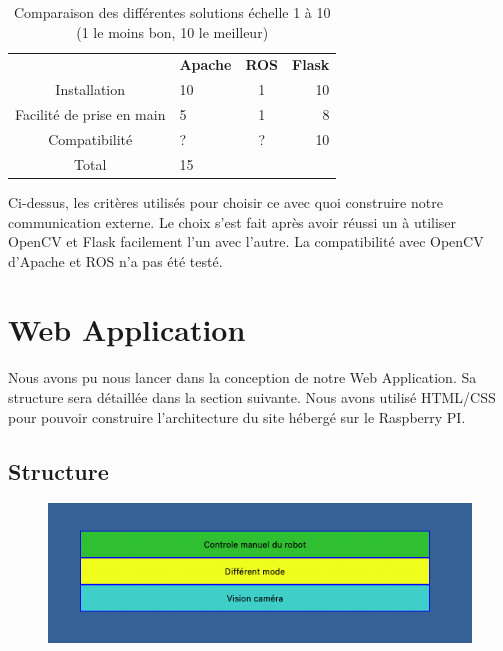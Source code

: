 \documentclass[
	a4paper,									%
	11pt,										%
	twoside,									%
	openright,									%
	notitlepage,									%
	parskip=half,								%
]{scrreprt}										%
\begin{document}
\begin{table}[h!]
    \begin{center}
        \caption{Comparaison des différentes solutions échelle 1 à 10 (1 le moins bon, 10 le meilleur)}
        \vspace{5mm}
        \label{tab:table1}
        \begin{tabular}{c|l|c|r} %
            \toprule
            \textbf{ } & \textbf{Apache} & \textbf{ROS} & \textbf{Flask}\\
            Installation & 10 & 1 & 10 \\
            Facilité de prise en main & 5 & 1 & 8\\
            Compatibilité & ? & ? & 10\\
			\midrule
			Total & 15 & \cellcolor{red}{2} & \cellcolor{green}{28}\\
            \bottomrule
        \end{tabular}
    \end{center}    
\end{table}

Ci-dessus, les critères utilisés pour choisir ce avec quoi construire notre communication externe. 
Le choix s'est fait après avoir réussi un à utiliser OpenCV et Flask facilement l'un avec l'autre. 
La compatibilité avec OpenCV d'Apache et ROS n'a pas été testé. \par


\chapter{Web Application}

Nous avons pu nous lancer dans la conception de notre Web Application. Sa structure sera détaillée dans la section suivante. 
Nous avons utilisé HTML/CSS pour pouvoir construire l'architecture du site hébergé sur le Raspberry PI. \par

\section{Structure}

\begin{figure}[!ht]
	\centering
	\includegraphics[scale=.5]{img/Page_Accueil_texte.png}
	\vspace{.5cm}
	\label{Accueil}
\end{figure}
\end{document}
